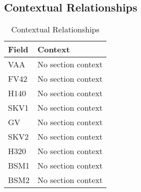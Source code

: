 \subsection{Contextual Relationships}

\begin{table}[h]
\centering
\begin{tabular}{l|l}
\hline
Field & Context \\
\hline
VAA & No section context \\
FV42 & No section context \\
H140 & No section context \\
SKV1 & No section context \\
GV & No section context \\
SKV2 & No section context \\
H320 & No section context \\
BSM1 & No section context \\
BSM2 & No section context \\
\hline
\end{tabular}
\caption{Contextual Relationships}
\end{table}

